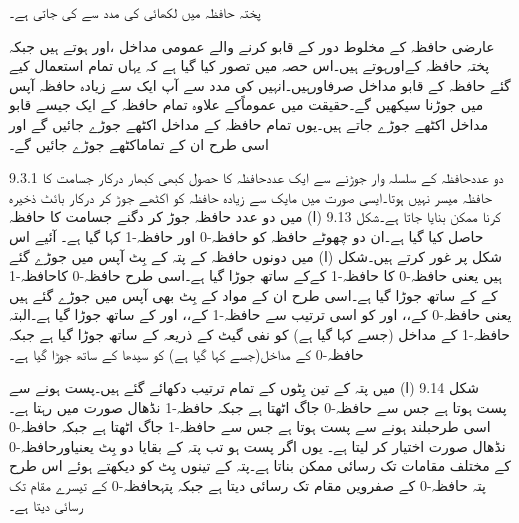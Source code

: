 پختہ حافظہ میں لکھائی  کی مدد سے کی جاتی ہے۔
	

عارضی حافظہ کے مخلوط دور کے قابو کرنے والے عمومی مداخل ،اور ہوتے ہیں جبکہ پختہ حافظہ کےاورہوتے ہیں۔اس حصہ میں تصور کیا گیا ہے کہ یہاں تمام استعمال کیے گئے حافظہ کے قابو مداخل صرفاورہیں۔انہیں کی مدد سے آپ ایک سے زیادہ حافظہ آپس میں جوڑنا سیکھیں گے۔حقیقت میں عموماًکے علاوہ تمام حافظہ کے ایک جیسے قابو مداخل اکٹھے جوڑے جاتے ہیں۔یوں تمام حافظہ کے مداخل اکٹھے جوڑے جائیں گے اور اسی طرح ان کے تماماکٹھے جوڑے جائیں گے۔

9.3.1 دو عددحافظہ کے سلسلہ وار جوڑنے سے ایک عددحافظہ کا حصول
	کبھی کبھار درکار جسامت کا حافظہ میسر نہیں ہوتا۔ایسی صورت میں مایک سے زیادہ حافظہ کو اکٹھے جوڑ کر درکار بائٹ ذخیرہ کرنا ممکن بنایا جاتا ہے۔شکل 9.13 (ا) میں دو عدد حافظہ جوڑ کر دگنے جسامت کا حافظہ حاصل کیا گیا ہے۔ان دو چھوٹے حافظہ کو حافظہ-0 اور حافظہ-1 کہا گیا ہے۔ آئیے اس شکل پر غور کرتے ہیں۔شکل (ا) میں دونوں حافظہ کے پتہ کے بِٹ آپس میں جوڑے گئے ہیں یعنی حافظہ-0 کا حافظہ-1 کےکے ساتھ جوڑا گیا ہے۔اسی طرح حافظہ-0 کاحافظہ-1 کے کے ساتھ جوڑا گیا ہے۔اسی طرح ان کے مواد کے بِٹ بھی آپس میں جوڑے گئے ہیں یعنی حافظہ-0 کے،، اور کو اسی ترتیب سے حافظہ-1 کے،، اور کے ساتھ جوڑا گیا ہے۔البتہ حافظہ-1  کے مداخل (جسے کہا گیا ہے)  کو نفی گیٹ کے ذریعہ کے ساتھ جوڑا گیا ہے جبکہ حافظہ-0 کے  مداخل(جسے کہا گیا ہے) کو سیدھا  کے ساتھ جوڑا گیا ہے۔



	شکل 9.14 (ا) میں پتہ کے تین بِٹوں کے تمام ترتیب دکھائے گئے ہیں۔پست ہونے سے پست ہوتا ہے جس سے حافظہ-0  جاگ اٹھتا ہے جبکہ حافظہ-1 نڈھال صورت میں رہتا ہے۔اسی طرحبلند ہونے سے پست ہوتا ہے جس سے حافظہ-1  جاگ اٹھتا ہے جبکہ حافظہ-0 نڈھال صورت اختیار کر لیتا ہے۔
	یوں اگر پست ہو تب پتہ کے بقایا دو بِٹ یعنیاورحافظہ-0 کے مختلف مقامات تک رسائی ممکن بناتا ہے۔پتہ کے تینوں بِٹ کو دیکھتے ہوئے اس طرح پتہ حافظہ-0 کے صفرویں مقام تک رسائی دیتا ہے جبکہ پتہحافظہ-0 کے تیسرے مقام تک رسائی دیتا ہے۔


